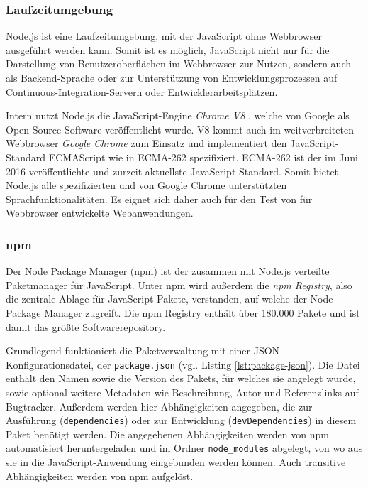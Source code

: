 \subsubsection{Laufzeitumgebung}
Node.js ist eine Laufzeitumgebung, mit der JavaScript ohne Webbrowser ausgeführt werden kann\cite[][1]{hughes2012einfuehrungnodejs}. Somit ist es möglich, JavaScript nicht nur für die Darstellung von Benutzeroberflächen im Webbrowser zur Nutzen, sondern auch als Backend-Sprache oder zur Unterstützung von Entwicklungsprozessen auf Continuous-Integration-Servern oder Entwicklerarbeitsplätzen.

Intern nutzt Node.js die JavaScript-Engine \textit{Chrome V8} \cite{nodejs}, welche von Google als Open-Source-Software veröffentlicht wurde. V8 kommt auch im weitverbreiteten Webbrowser \textit{Google Chrome} zum Einsatz und implementiert den JavaScript-Standard ECMAScript wie in ECMA-262 spezifiziert\cite{chromev8}. ECMA-262 ist der im Juni 2016 veröffentlichte und zurzeit aktuellste JavaScript-Standard\cite{ecma262}. Somit bietet Node.js alle spezifizierten und von Google Chrome unterstützten Sprachfunktionalitäten. Es eignet sich daher auch für den Test von für Webbrowser entwickelte Webanwendungen.

\subsubsection{npm}
Der Node Package Manager (npm) ist der zusammen mit Node.js verteilte Paketmanager für JavaScript. Unter npm wird außerdem die \textit{npm Registry}, also die zentrale Ablage für JavaScript-Pakete, verstanden, auf welche der Node Package Manager zugreift. \cite{npm-about} Die npm Registry enthält über 180.000 Pakete und ist damit das größte Softwarerepository\cite{modulecount}.

Grundlegend funktioniert die Paketverwaltung mit einer JSON-Konfigurationsdatei, der \texttt{package.json} (vgl. Listing \ref{lst:package-json}). Die Datei enthält den Namen sowie die Version des Pakets, für welches sie angelegt wurde, sowie optional weitere Metadaten wie Beschreibung, Autor und Referenzlinks auf Bugtracker. Außerdem werden hier Abhängigkeiten angegeben, die zur Ausführung (\texttt{dependencies}) oder zur Entwicklung (\texttt{devDependencies}) in diesem Paket benötigt werden. \cite{npm-packagejson}Die angegebenen Abhängigkeiten werden von npm automatisiert heruntergeladen und im Ordner \texttt{node\_modules} abgelegt, von wo aus sie in die JavaScript-Anwendung eingebunden werden können. Auch transitive Abhängigkeiten werden von npm aufgelöst. 

